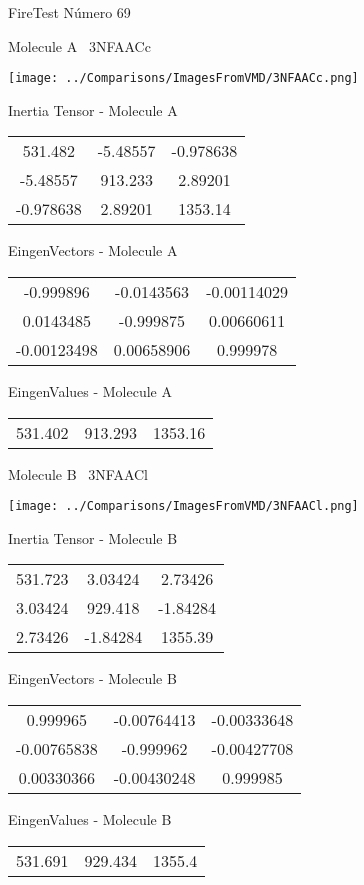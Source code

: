 \vtab[-3cm]
\begin{center}
{\large FireTest \tab Número 69}
\end{center}
\begin{multicols}{2}
\begin{center}

Molecule A \
3NFAACc

\texttt{[image: ../Comparisons/ImagesFromVMD/3NFAACc.png]}

Inertia Tensor - Molecule A \\
\begin{tabular}{|c c c|}
531.482	 & 	-5.48557	 & 	-0.978638	 \\
-5.48557	 & 	913.233	 & 	2.89201	 \\
-0.978638	 & 	2.89201	 & 	1353.14
\end{tabular}

\vtab
 EingenVectors - Molecule A     \\
\begin{tabular}{|c c c|}
-0.999896	 & 	-0.0143563	 & 	-0.00114029	 \\
0.0143485	 & 	-0.999875	 & 	0.00660611	 \\
-0.00123498	 & 	0.00658906	 & 	0.999978
\end{tabular}

\vtab
 EingenValues - Molecule A     \\
\begin{tabular}{|c c c|}
531.402	 & 	913.293	 & 	1353.16	 \\
\end{tabular}
\columnbreak

Molecule B \
3NFAACl

\texttt{[image: ../Comparisons/ImagesFromVMD/3NFAACl.png]}

Inertia Tensor - Molecule B \\
\begin{tabular}{|c c c|}
531.723	 & 	3.03424	 & 	2.73426	 \\
3.03424	 & 	929.418	 & 	-1.84284	 \\
2.73426	 & 	-1.84284	 & 	1355.39
\end{tabular}

\vtab
 EingenVectors - Molecule B     \\
\begin{tabular}{|c c c|}
0.999965	 & 	-0.00764413	 & 	-0.00333648	 \\
-0.00765838	 & 	-0.999962	 & 	-0.00427708	 \\
0.00330366	 & 	-0.00430248	 & 	0.999985
\end{tabular}

\vtab
 EingenValues - Molecule B     \\
\begin{tabular}{|c c c|}
531.691	 & 	929.434	 & 	1355.4	 \\
\end{tabular}

\end{center}
\end{multicols}

